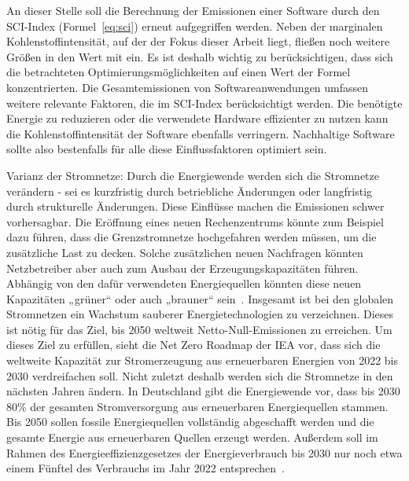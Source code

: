 %
%

An dieser Stelle soll die Berechnung der Emissionen einer Software durch den \ac{SCI}-Index (Formel~\ref{eq:sci}) erneut aufgegriffen werden.
Neben der marginalen Kohlenstoffintensität, auf der der Fokus dieser Arbeit liegt, fließen noch weitere Größen in den Wert mit ein.
Es ist deshalb wichtig zu berücksichtigen, dass sich die betrachteten Optimierungsmöglichkeiten auf einen Wert der Formel konzentrierten.
Die Gesamtemissionen von Softwareanwendungen umfassen weitere relevante Faktoren, die im \ac{SCI}-Index berücksichtigt werden.
Die benötigte Energie zu reduzieren oder die verwendete Hardware effizienter zu nutzen kann die Kohlenstoffintensität der Software ebenfalls verringern.
Nachhaltige Software sollte also bestenfalls für alle diese Einflussfaktoren optimiert sein.

Varianz der Stromnetze: Durch die Energiewende werden sich die Stromnetze verändern - sei es kurzfristig durch betriebliche Änderungen oder langfristig durch strukturelle Änderungen.
Diese Einflüsse machen die Emissionen schwer vorhersagbar.
Die Eröffnung eines neuen Rechenzentrums könnte zum Beispiel dazu führen, dass die Grenzstromnetze hochgefahren werden müssen, um die zusätzliche Last zu decken.
Solche zusätzlichen neuen Nachfragen könnten Netzbetreiber aber auch zum Ausbau der Erzeugungskapazitäten führen.
Abhängig von den dafür verwendeten Energiequellen könnten diese neuen Kapazitäten „grüner“ oder auch „brauner“ sein~\cite{WattTime.2022}.
Insgesamt ist bei den globalen Stromnetzen ein Wachstum sauberer Energietechnologien zu verzeichnen.
Dieses ist nötig für das Ziel, bis 2050 weltweit Netto-Null-Emissionen zu erreichen.
Um dieses Ziel zu erfüllen, sieht die Net Zero Roadmap der IEA vor, dass sich die weltweite Kapazität zur Stromerzeugung aus erneuerbaren Energien von 2022 bis 2030 verdreifachen soll.
Nicht zuletzt deshalb werden sich die Stromnetze in den nächsten Jahren ändern.
In Deutschland gibt die Energiewende vor, dass bis 2030 80\% der gesamten Stromversorgung aus erneuerbaren Energiequellen stammen.
Bis 2050 sollen fossile Energiequellen vollständig abgeschafft werden und die gesamte Energie aus erneuerbaren Quellen erzeugt werden.
Außerdem soll im Rahmen des Energieeffizienzgesetzes der Energieverbrauch bis 2030 nur noch etwa einem Fünftel des Verbrauchs im Jahr 2022 entsprechen~\cite{InternationalEnergyAgengy.2023}.

